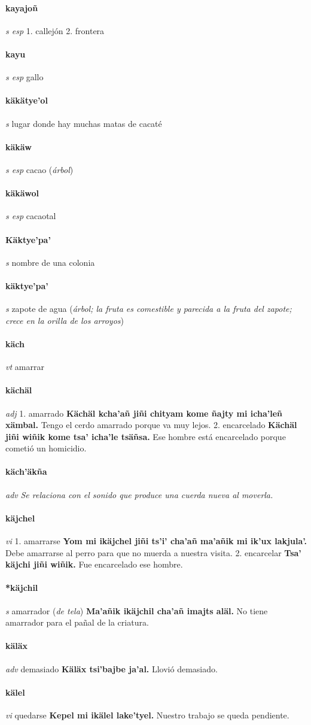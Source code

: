 \documentclass{scrbook}
\newcommand{\entry}[1]{\paragraph{#1}}
\newcommand{\onedefinition}[1]{#1.}
\newcommand{\nontranslationdef}[1]{\textit{#1}}
\newcommand{\partofspeech}[1]{\textit{#1}}
\newcommand{\spanishtranslation}[1]{#1}
\newcommand{\clarification}[1]{(\textit{#1})}
\newcommand{\cholexample}[1]{\textbf{#1}}
\newcommand{\exampletranslation}[1]{#1}
\begin{document}
\begin{multicols}{2}
\entry{kayajoñ}
\partofspeech{s esp}
\onedefinition{1}
\spanishtranslation{callejón}
\onedefinition{2}
\spanishtranslation{frontera}

\entry{kayu}
\partofspeech{s esp}
\spanishtranslation{gallo}

\entry{käkätye'ol}
\partofspeech{s}
\spanishtranslation{lugar donde hay muchas matas de cacaté}

\entry{käkäw}
\partofspeech{s esp}
\spanishtranslation{cacao}
\clarification{árbol}

\entry{käkäwol}
\partofspeech{s esp}
\spanishtranslation{cacaotal}

\entry{Käktye'pa'}
\partofspeech{s}
\spanishtranslation{nombre de una colonia}

\entry{käktye'pa'}
\partofspeech{s}
\spanishtranslation{zapote de agua}
\clarification{árbol; la fruta es comestible y parecida a la fruta del zapote; crece en la orilla de los arroyos}

\entry{käch}
\partofspeech{vt}
\spanishtranslation{amarrar}

\entry{kächäl}
\partofspeech{adj}
\onedefinition{1}
\spanishtranslation{amarrado}
\cholexample{Kächäl kcha'añ jiñi chityam kome ñajty mi icha'leñ xämbal.}
\exampletranslation{Tengo el cerdo amarrado porque va muy lejos.}
\onedefinition{2}
\spanishtranslation{encarcelado}
\cholexample{Kächäl jiñi wiñik kome tsa' icha'le tsäñsa.}
\exampletranslation{Ese hombre está encarcelado porque cometió un homicidio.}

\entry{käch'äkña}
\partofspeech{adv}
\nontranslationdef{Se relaciona con el sonido que produce una cuerda nueva al moverla.}

\entry{käjchel}
\partofspeech{vi}
\onedefinition{1}
\spanishtranslation{amarrarse}
\cholexample{Yom mi ikäjchel jiñi ts'i' cha'añ ma'añik mi ik'ux lakjula'.}
\exampletranslation{Debe amarrarse al perro para que no muerda a nuestra visita.}
\onedefinition{2}
\spanishtranslation{encarcelar}
\cholexample{Tsa' käjchi jiñi wiñik.}
\exampletranslation{Fue encarcelado ese hombre.}

\entry{*käjchil}
\partofspeech{s}
\spanishtranslation{amarrador}
\clarification{de tela}
\cholexample{Ma'añik ikäjchil cha'añ imajts aläl.}
\exampletranslation{No tiene amarrador para el pañal de la criatura.}

\entry{käläx}
\partofspeech{adv}
\spanishtranslation{demasiado}
\cholexample{Käläx tsi'bajbe ja'al.}
\exampletranslation{Llovió demasiado.}

\entry{kälel}
\partofspeech{vi}
\spanishtranslation{quedarse}
\cholexample{Kepel mi ikälel lake'tyel.}
\exampletranslation{Nuestro trabajo se queda pendiente.}


\end{multicols}
\end{document}
